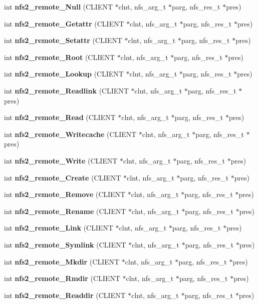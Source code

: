 \begin{DoxyCompactItemize}
\item 
int {\bf nfs2\_\-remote\_\-Null} (CLIENT $\ast$clnt, nfs\_\-arg\_\-t $\ast$parg, nfs\_\-res\_\-t $\ast$pres)
\item 
int {\bf nfs2\_\-remote\_\-Getattr} (CLIENT $\ast$clnt, nfs\_\-arg\_\-t $\ast$parg, nfs\_\-res\_\-t $\ast$pres)
\item 
int {\bf nfs2\_\-remote\_\-Setattr} (CLIENT $\ast$clnt, nfs\_\-arg\_\-t $\ast$parg, nfs\_\-res\_\-t $\ast$pres)
\item 
int {\bf nfs2\_\-remote\_\-Root} (CLIENT $\ast$clnt, nfs\_\-arg\_\-t $\ast$parg, nfs\_\-res\_\-t $\ast$pres)
\item 
int {\bf nfs2\_\-remote\_\-Lookup} (CLIENT $\ast$clnt, nfs\_\-arg\_\-t $\ast$parg, nfs\_\-res\_\-t $\ast$pres)
\item 
int {\bf nfs2\_\-remote\_\-Readlink} (CLIENT $\ast$clnt, nfs\_\-arg\_\-t $\ast$parg, nfs\_\-res\_\-t $\ast$pres)
\item 
int {\bf nfs2\_\-remote\_\-Read} (CLIENT $\ast$clnt, nfs\_\-arg\_\-t $\ast$parg, nfs\_\-res\_\-t $\ast$pres)
\item 
int {\bf nfs2\_\-remote\_\-Writecache} (CLIENT $\ast$clnt, nfs\_\-arg\_\-t $\ast$parg, nfs\_\-res\_\-t $\ast$pres)
\item 
int {\bf nfs2\_\-remote\_\-Write} (CLIENT $\ast$clnt, nfs\_\-arg\_\-t $\ast$parg, nfs\_\-res\_\-t $\ast$pres)
\item 
int {\bf nfs2\_\-remote\_\-Create} (CLIENT $\ast$clnt, nfs\_\-arg\_\-t $\ast$parg, nfs\_\-res\_\-t $\ast$pres)
\item 
int {\bf nfs2\_\-remote\_\-Remove} (CLIENT $\ast$clnt, nfs\_\-arg\_\-t $\ast$parg, nfs\_\-res\_\-t $\ast$pres)
\item 
int {\bf nfs2\_\-remote\_\-Rename} (CLIENT $\ast$clnt, nfs\_\-arg\_\-t $\ast$parg, nfs\_\-res\_\-t $\ast$pres)
\item 
int {\bf nfs2\_\-remote\_\-Link} (CLIENT $\ast$clnt, nfs\_\-arg\_\-t $\ast$parg, nfs\_\-res\_\-t $\ast$pres)
\item 
int {\bf nfs2\_\-remote\_\-Symlink} (CLIENT $\ast$clnt, nfs\_\-arg\_\-t $\ast$parg, nfs\_\-res\_\-t $\ast$pres)
\item 
int {\bf nfs2\_\-remote\_\-Mkdir} (CLIENT $\ast$clnt, nfs\_\-arg\_\-t $\ast$parg, nfs\_\-res\_\-t $\ast$pres)
\item 
int {\bf nfs2\_\-remote\_\-Rmdir} (CLIENT $\ast$clnt, nfs\_\-arg\_\-t $\ast$parg, nfs\_\-res\_\-t $\ast$pres)
\item 
int {\bf nfs2\_\-remote\_\-Readdir} (CLIENT $\ast$clnt, nfs\_\-arg\_\-t $\ast$parg, nfs\_\-res\_\-t $\ast$pres)

\end{DoxyCompactItemize}
